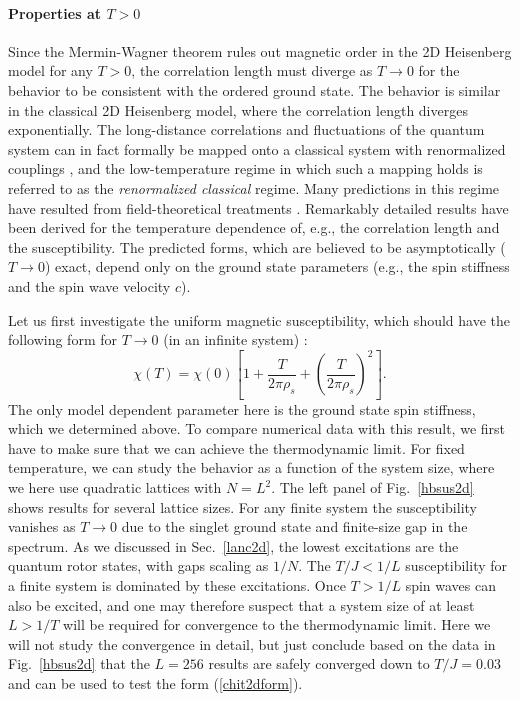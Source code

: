 \documentclass[draft,numberedheadings]{aipproc}
\begin{document}
\paragraph{Properties at $T>0$} 

Since the Mermin-Wagner theorem rules out magnetic order in the 2D Heisenberg model for any $T>0$, the correlation length must diverge as $T\to 0$ 
for the behavior to be consistent with the ordered ground state. The behavior is similar in the classical 2D Heisenberg model, where the correlation
length diverges exponentially. The long-distance correlations and fluctuations of the quantum system can in fact formally be mapped onto a classical
system with renormalized couplings \cite{chn}, and the low-temperature regime in which such a mapping holds is referred to as the {\it renormalized
classical} regime. Many predictions in this regime have resulted from field-theoretical treatments \cite{chn,hasenfratz93,chubukov}. Remarkably detailed 
results have been derived for the temperature dependence of, e.g., the correlation length and the susceptibility. The predicted forms, which are believed 
to be asymptotically ($T \to 0$) exact, depend only on the ground state parameters (e.g., the spin stiffness and the spin wave velocity $c$). 

Let us first investigate the uniform magnetic susceptibility, which should have the following form for $T\to 0$ (in an
infinite system) \cite{hasenfratz93} :
\begin{equation}
\chi(T)=\chi(0)\left [1+ \frac{T}{2\pi\rho_s} + \left (\frac{T}{2\pi\rho_s}\right )^2\right ].
\label{chit2dform}
\end{equation}
The only model dependent parameter here is the ground state spin stiffness, which we determined above. To compare numerical data with this result,
we first have to make sure that we can achieve the thermodynamic limit. For fixed temperature, we can study the behavior as a function of the system 
size, where we here use quadratic lattices with $N=L^2$. The left panel of Fig.~\ref{hbsus2d} shows results for several lattice sizes. For any finite 
system the susceptibility vanishes as $T\to 0$ due to the singlet ground state and finite-size gap in the spectrum. As we discussed in Sec.~\ref{lanc2d}, 
the lowest excitations are the quantum rotor states, with gaps scaling as $1/N$. The $T/J < 1/L$ susceptibility for a finite system is dominated by 
these excitations. Once $T>1/L$ spin waves can also be excited, and one may therefore suspect that a system size of at least $L>1/T$ will be required 
for convergence to the thermodynamic limit. Here we will not study the convergence in detail, but just conclude based on the data in Fig.~\ref{hbsus2d} 
that the $L=256$ results are safely converged down to $T/J=0.03$ and can be used to test the form (\ref{chit2dform}).
\end{document}
